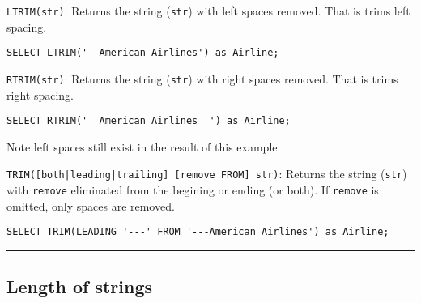 \documentclass{article}
\begin{document}
\begin{outline}
 
    \1 \texttt{LTRIM(str)}: Returns the string (\texttt{str}) with left spaces removed.  That is trims left spacing.  
   
   
\begin{lstlisting}[frame=single]  
SELECT LTRIM('  American Airlines') as Airline;
\end{lstlisting} 




    \1 \texttt{RTRIM(str)}: Returns the string (\texttt{str}) with right spaces removed.  That is trims right spacing.    
   
   
\begin{lstlisting}[frame=single]  
SELECT RTRIM('  American Airlines  ') as Airline;
\end{lstlisting} 
Note left spaces still exist in the result of this example.  





    \1 \texttt{TRIM([both|leading|trailing] [remove FROM] str)}: Returns
the string (\texttt{str}) with \texttt{remove} eliminated from the   begining
or ending (or both).  If \texttt{remove} is omitted, only spaces are removed.
   
   
\begin{lstlisting}[frame=single]  
SELECT TRIM(LEADING '---' FROM '---American Airlines') as Airline;
\end{lstlisting} 



\end{outline}
 
  
  

\hspace{-0.5cm}\rule[-0.101in]{\textwidth}{0.0025in}
    
  
  
  
  
  
  
  
  
  
  
  
  
  

\subsection*{Length of strings}
\end{document}
